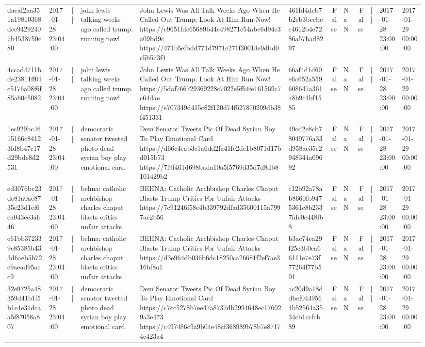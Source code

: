 \begin{tabular}{llllllrlrlll}
daeaf2aa351a19810368dce94292407b4538750c80 & 2017-01-28 23:04:00 & [] & john lewis talking weeks ago called trump. running now! & John Lewis Was All Talk Weeks Ago When He Called Out Trump; Look At Him Run Now! https://e9651fdc65689b44c498271c54abe6d94c3a09bd9c https://471b5efbdd771d7971e271f30013e9dbd0c5b573f4 & 461fd4deb7b2eb3becbee4612b4e7286a57bad8297 & False & NaN & False & [] & 2017-01-28 23:00:00 & 2017-01-29 00:00:00 \\
4ccad4711bde23811ff01c5176a08f6f85a60c5082 & 2017-01-28 23:04:00 & [] & john lewis talking weeks ago called trump. running now! & John Lewis Was All Talk Weeks Ago When He Called Out Trump; Look At Him Run Now! https://5daf766729369228c7022e5f64fe161569c7c64dae https://e707349d415c82f120d74f527870209db38f451331 & 66af4d1d60e6a652a559608647a361a8b9c1bf1585 & False & NaN & False & [] & 2017-01-28 23:00:00 & 2017-01-29 00:00:00 \\
1ec929bc4615166c84123fd8b47c17d29bde8d2531 & 2017-01-28 23:04:00 & [] & democratic senator tweeted photo dead syrian boy play emotional card. & Dem Senator Tweets Pic Of Dead Syrian Boy To Play Emotional Card https://d66c4cab3c1a6dd2fa41fe2de1b8071d17bd015b73 https://7f9f461d698bada10a5f5769d35d7d8db8101429b2 & 49cd2e8cb78049776a33d958ac35c2948344a09692 & False & NaN & False & [] & 2017-01-28 23:00:00 & 2017-01-29 00:00:00 \\
ed3076bc23de81a0ac8735e23d1ef6ea043ce3ab46 & 2017-01-28 23:04:00 & [] & behna: catholic archbishop charles chaput blasts critics unfair attacks & BEHNA: Catholic Archbishop Charles Chaput Blasts Trump Critics For Unfair Attacks https://7c91246f58e4b339792dfad35600115a7997ac2b56 & c12b92a78ab8660fb9475361c8b2337fdc0e448fb8 & False & NaN & False & [] & 2017-01-28 23:00:00 & 2017-01-29 00:00:00 \\
e61bb372339c85385b433d6aeb5b72e9aead95acc9 & 2017-01-28 23:04:00 & [] & behna: catholic archbishop charles chaput blasts critics unfair attacks & BEHNA: Catholic Archbishop Charles Chaput Blasts Trump Critics For Unfair Attacks https://d3e964db036b6dc18250ca26681f2ef7ae316bf8a1 & b3ac74ea29f25c3b0ea66111e7e73f77264f77b501 & False & NaN & False & [] & 2017-01-28 23:00:00 & 2017-01-29 00:00:00 \\
32e9725a48359d41b1f5b1c4e31dcaa5f87058a807 & 2017-01-28 23:04:00 & [] & democratic senator tweeted photo dead syrian boy play emotional card. & Dem Senator Tweets Pic Of Dead Syrian Boy To Play Emotional Card https://c7cc5278b7ee47a8737db2994648ec176029a3e473 https://c497486c9a9b04e48cf368989b78b7e87174c423a4 & ac20d9a18ddbcf0449564b52564a3534cb1ccfcb89 & False & NaN & False & [] & 2017-01-28 23:00:00 & 2017-01-29 00:00:00 \\

\end{tabular}
